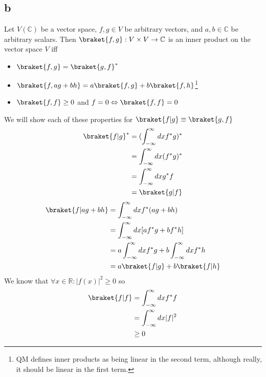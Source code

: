 \subsection*{b}
Let $V(\mathbb{C})$ be a vector space, $f,g \in V$ be arbitrary vectors, and $a,b\in\mathbb{C}$ be arbitrary scalars. Then $\braket{f,g}:V\times V \rightarrow\mathbb{C}$ is an inner product on the vector space $V$ iff

\begin{itemize}
    \item $\braket{f,g} = \braket{g,f}^\ast$
    \item $\braket{f,ag+bh} = a\braket{f,g}+b\braket{f,h}$\footnote{QM defines inner products as being linear in the second term, although really, it should be linear in the first term.}
    \item $\braket{f,f} \geq 0$ and $f=0 \Leftrightarrow \braket{f,f}=0$
\end{itemize}
We will show each of these properties for $\braket{f|g} \equiv \braket{g,f}$
\begin{equation}
    \begin{split}
        \braket{f|g}^\ast&=(\int_{-\infty}^\infty dx f^\ast g)^\ast\\
        &=\int_{-\infty}^\infty dx (f^\ast g)^\ast\\
        &=\int_{-\infty}^\infty dx g^\ast f\\
        &= \braket{g|f}
    \end{split}
\end{equation}
\begin{equation}
\begin{split}
    \braket{f|ag+bh} &= \int_{-\infty}^\infty dxf^\ast(ag+bh)\\
    &= \int_{-\infty}^\infty dx [af^\ast g+bf^\ast h]\\
    &= a\int_{-\infty}^\infty dx f^\ast g + b\int_{-\infty}^\infty dx f^\ast h\\
    &= a\braket{f|g}+b\braket{f|h}
\end{split}
\end{equation}
We know that $\forall x \in \mathbb{R}:|f(x)|^2 \geq 0$ so
\begin{equation}
    \begin{split}
        \braket{f|f} &= \int_{-\infty}^{\infty}dxf^\ast f\\
        &=\int_{-\infty}^\infty dx |f|^2\\
        &\geq 0
    \end{split}   
\end{equation}
